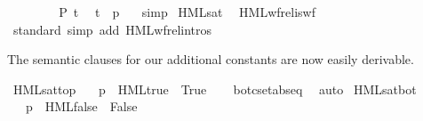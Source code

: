 \begin{isabellebody}
\ \ \ \ \isamarkupfalse%
\isanewline
\ \ \isamarkupfalse%
\ {\isacartoucheopen}P\ t{\isacartoucheclose}\ \isamarkupfalse%
\ {\isacartoucheopen}t\ {\isacharequal}{\kern0pt}\ {\isacharparenleft}{\kern0pt}p{\isacharcomma}{\kern0pt}\ {\isasymphi}{\isacharparenright}{\kern0pt}{\isacartoucheclose}\ \isamarkupfalse%
\ simp\isanewline
{}\isamarkupfalse%
%
\endisatagproof
{\isafoldproof}%
%
\isadelimproof
\isanewline
%
\endisadelimproof
%
\isadelimvisible
\isanewline
%
\endisadelimvisible
%
\isatagvisible
{}\isamarkupfalse%
\ HML{\isacharunderscore}{\kern0pt}sat\ \isamarkupfalse%
\ HML{\isacharunderscore}{\kern0pt}wf{\isacharunderscore}{\kern0pt}rel{\isacharunderscore}{\kern0pt}is{\isacharunderscore}{\kern0pt}wf\ \isanewline
\ \ \isamarkupfalse%
\ {\isacharparenleft}{\kern0pt}standard{\isacharcomma}{\kern0pt}\ {\isacharparenleft}{\kern0pt}simp\ add{\isacharcolon}{\kern0pt}\ HML{\isacharunderscore}{\kern0pt}wf{\isacharunderscore}{\kern0pt}rel{\isachardot}{\kern0pt}intros{\isacharparenright}{\kern0pt}{\isacharplus}{\kern0pt}{\isacharparenright}{\kern0pt}%
\endisatagvisible
{\isafoldvisible}%
%
\isadelimvisible
%
\endisadelimvisible
%
\begin{isamarkuptext}%
The semantic clauses for our additional constants are now easily derivable.%
\end{isamarkuptext}\isamarkuptrue%
\isamarkupfalse%
\ HML{\isacharunderscore}{\kern0pt}sat{\isacharunderscore}{\kern0pt}top{\isacharcolon}{\kern0pt}\isanewline
\ \ \ {\isacartoucheopen}{\isacharparenleft}{\kern0pt}p\ {\isasymTurnstile}\ HML{\isacharunderscore}{\kern0pt}true{\isacharparenright}{\kern0pt}\ {\isacharequal}{\kern0pt}\ True{\isacartoucheclose}\isanewline
%
\isadelimproof
\ \ %
\endisadelimproof
%
\isatagproof
{}\isamarkupfalse%
\ bot{\isacharunderscore}{\kern0pt}cset{\isachardot}{\kern0pt}abs{\isacharunderscore}{\kern0pt}eq\ \isamarkupfalse%
\ auto%
\endisatagproof
{\isafoldproof}%
%
\isadelimproof
\isanewline
%
\endisadelimproof
{}\isamarkupfalse%
\ HML{\isacharunderscore}{\kern0pt}sat{\isacharunderscore}{\kern0pt}bot{\isacharcolon}{\kern0pt}\isanewline
\ \ \ {\isacartoucheopen}{\isacharparenleft}{\kern0pt}p\ {\isasymTurnstile}\ HML{\isacharunderscore}{\kern0pt}false{\isacharparenright}{\kern0pt}\ {\isacharequal}{\kern0pt}\ False{\isacartoucheclose}\isanewline
%
\isadelimproof
\ \ %
\endisadelimproof
%
\isatagproof

\end{isabellebody}
